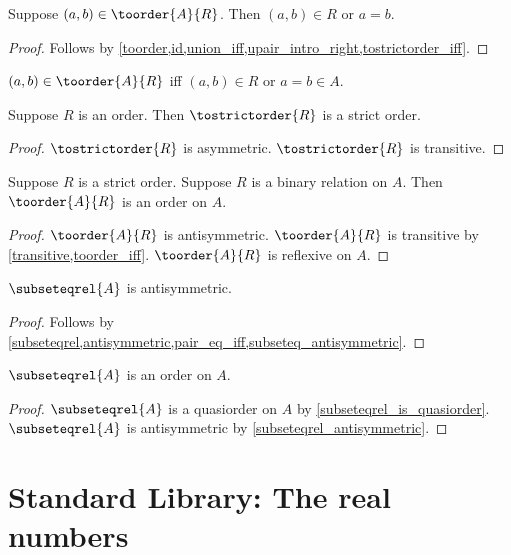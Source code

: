 \begin{proposition}\label{toorder_elim}
    Suppose $(a,b)\in\toorder{A}{R}$.
    Then $(a,b)\in R$ or $a = b$.
\end{proposition}
\begin{proof}
    Follows by \cref{toorder,id,union_iff,upair_intro_right,tostrictorder_iff}.
\end{proof}

\begin{proposition}\label{toorder_iff}
    $(a,b)\in\toorder{A}{R}$ iff $(a,b)\in R$ or $a = b\in A$.
\end{proposition}

\begin{proposition}\label{strictorder_from_order}
    Suppose $R$ is an order.
    Then $\tostrictorder{R}$ is a strict order.
\end{proposition}
\begin{proof}
    $\tostrictorder{R}$ is asymmetric.
    $\tostrictorder{R}$ is transitive.
\end{proof}

\begin{proposition}\label{order_from_strictorder}
    Suppose $R$ is a strict order.
    Suppose $R$ is a binary relation on $A$.
    Then $\toorder{A}{R}$ is an order on $A$.
\end{proposition}
\begin{proof}
    $\toorder{A}{R}$ is antisymmetric.
    $\toorder{A}{R}$ is transitive by \cref{transitive,toorder_iff}.
    $\toorder{A}{R}$ is reflexive on $A$.
\end{proof}

\begin{proposition}\label{subseteqrel_antisymmetric}
    $\subseteqrel{A}$ is antisymmetric.
\end{proposition}
\begin{proof}
    Follows by \cref{subseteqrel,antisymmetric,pair_eq_iff,subseteq_antisymmetric}.
\end{proof}


\begin{proposition}\label{subseteqrel_is_order}
    $\subseteqrel{A}$ is an order on $A$.
\end{proposition}
\begin{proof}
    $\subseteqrel{A}$ is a quasiorder on $A$ by \cref{subseteqrel_is_quasiorder}.
    $\subseteqrel{A}$ is antisymmetric by \cref{subseteqrel_antisymmetric}.
\end{proof}
\section{Standard Library: The real numbers}

